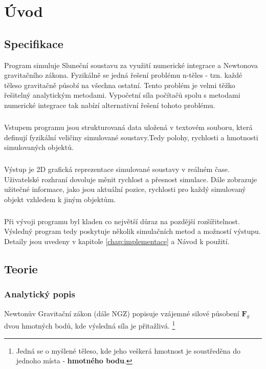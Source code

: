 
\chapter{Úvod}
\label{chap:uvod}

\section{Specifikace}
Program simuluje Sluneční soustavu za využití numerické integrace a Newtonova gravitačního zákona. Fyzikálně se jedná řešení problému n-těles - tzn. každé těleso gravitačně působí na všechna ostatní. Tento problém je velmi těžko řešitelný analytickým metodami. Vypočetní síla počítačů spolu s metodami numerické integrace tak nabízí alternativní řešení tohoto problému.

\paragraph{}
Vstupem programu jsou strukturovaná data uložená v textovém souboru, která definují fyzikální veličiny simulované soustavy.Tedy polohy, rychlosti a hmotnosti simulovaných objektů. 
\paragraph{}
Výstup je 2D grafická reprezentace simulované soustavy v reálném čase. Uživatelské rozhraní dovoluje měnit rychlost a přesnost simulace. Dále zobrazuje užitečné informace, jako jsou aktuální pozice, rychlosti pro každý simulovaný objekt vzhledem k jiným objektům.
\paragraph{}
Při vývoji programu byl kladen co největší důraz na pozdější rozšířitelnost. Výsledný program tedy poskytuje několik simulačních metod a možností výstupu. Detaily jsou uvedeny v kapitole \ref{chap:implementace} a Návod k použití.

\section{Teorie}
\subsection{Analytický popis}
Newtonův Gravitační zákon (dále NGZ) popisuje vzájemné silové působení $ \boldsymbol{F}_g $ dvou hmotných bodů, kde výsledná síla je přitažlivá.
\footnote{Jedná se o myšlené těleso, kde jeho veškerá hmotnost je soustředěna do jednoho místa - \textbf{hmotného bodu}. }

